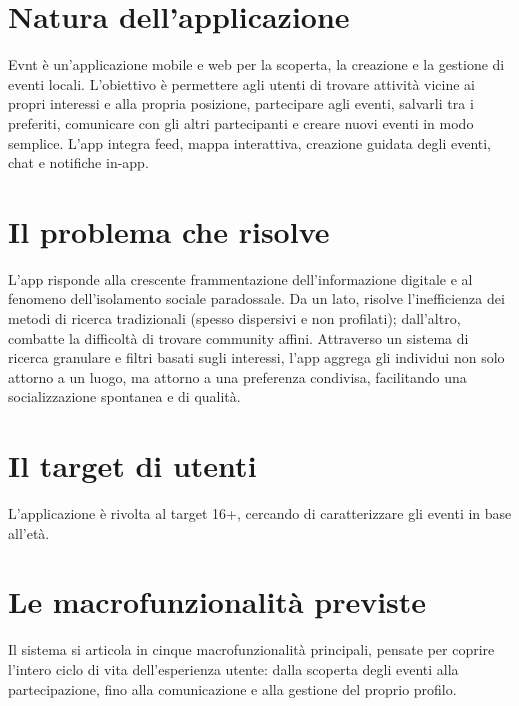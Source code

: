 \newcommand{\inputparam}[2]{%
  \def\parg{#2}
  
}
\inputparam{intestazione}{Idea progettuale}
\newpage
\section{Natura dell'applicazione}
Evnt è un’applicazione mobile e web per la scoperta, la creazione e la gestione di eventi locali. L’obiettivo è permettere agli utenti di trovare attività vicine ai propri interessi e alla propria posizione, partecipare agli eventi, salvarli tra i preferiti, comunicare con gli altri partecipanti e creare nuovi eventi in modo semplice. L’app integra feed, mappa interattiva, creazione guidata degli eventi, chat e notifiche in-app.
\section{Il problema che risolve}
L'app risponde alla crescente frammentazione dell’informazione digitale e al fenomeno dell'isolamento sociale paradossale. Da un lato, risolve l'inefficienza dei metodi di ricerca tradizionali (spesso dispersivi e non profilati); dall’altro, combatte la difficoltà di trovare community affini. Attraverso un sistema di ricerca granulare e filtri basati sugli interessi, l'app aggrega gli individui non solo attorno a un luogo, ma attorno a una preferenza condivisa, facilitando una socializzazione spontanea e di qualità.

\section{Il target di utenti}
L’applicazione è rivolta al target 16+, cercando di caratterizzare gli eventi in base all’età.

\section{Le macrofunzionalità previste}
Il sistema si articola in cinque macrofunzionalità principali, pensate per coprire l’intero ciclo di vita dell’esperienza utente: dalla scoperta degli eventi alla partecipazione, fino alla comunicazione e alla gestione del proprio profilo.

